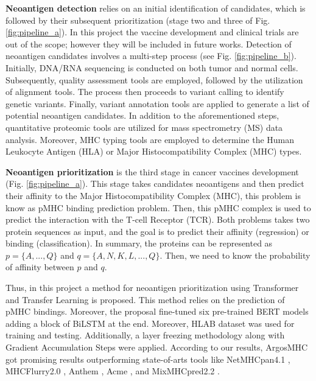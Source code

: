 \textbf{Neoantigen detection} relies on an initial identification of candidates, which is followed by their subsequent prioritization (stage two and three of Fig. \ref{fig:pipeline_a}). In this project the vaccine development and clinical trials are out of the scope; however they will be included in future works. Detection of neoantigen candidates involves a multi-step process (see Fig. \ref{fig:pipeline_b}). Initially, DNA/RNA sequencing is conducted on both tumor and normal cells. Subsequently, quality assessment tools are employed, followed by the utilization of alignment tools. The process then proceeds to variant calling to identify genetic variants. Finally, variant annotation tools are applied to generate a list of potential neoantigen candidates. In addition to the aforementioned steps, quantitative proteomic tools are utilized for mass spectrometry (MS) data analysis. Moreover, MHC typing tools are employed to determine the Human Leukocyte Antigen (HLA) or Major Histocompatibility Complex (MHC) types.

\textbf{Neoantigen prioritization} is the third stage in cancer vaccines development (Fig. \ref{fig:pipeline_a}). This stage takes candidates neoantigens and then predict their affinity to the Major Histocompatibility Complex (MHC), this problem is know as pMHC binding prediction problem. Then,  this pMHC complex is used to predict the interaction with the T-cell Receptor (TCR). Both problems takes two protein sequences as input, and the goal is to predict their affinity (regression) or binding (classification). In summary, the proteins can be represented as $p = \{ A, ... , Q \}$ and  $q = \{ A, N, K, L, ... ,Q \}$. Then, we need to know the probability of affinity between $p$ and $q$. 

Thus, in this project a method for neoantigen prioritization using Transformer and Transfer Learning is proposed. This method relies on the prediction of pMHC bindings. Moreover, the proposal fine-tuned six pre-trained BERT models adding a block of BiLSTM at the end. Moreover, HLAB dataset \cite{zhang2022hlab} was used for training and testing. Additionally, a layer freezing methodology along with Gradient Accumulation Steps were applied. According to our results, ArgosMHC got promising results outperforming state-of-arts tools like NetMHCpan4.1 \cite{reynisson2020netmhcpan}, MHCFlurry2.0 \cite{o2020mhcflurry}, Anthem \cite{mei2021anthem}, Acme \cite{hu2019acme}, and MixMHCpred2.2 \cite{gfeller2023improved}.
